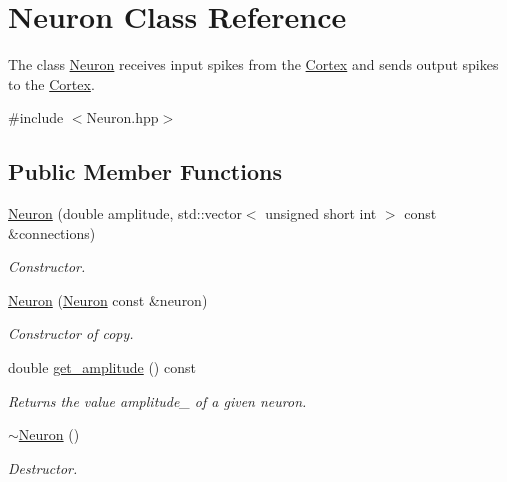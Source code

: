 \hypertarget{class_neuron}{}\section{Neuron Class Reference}
\label{class_neuron}


The class \hyperlink{class_neuron}{Neuron} receives input spikes from the \hyperlink{class_cortex}{Cortex} and sends output spikes to the \hyperlink{class_cortex}{Cortex}.  




{\ttfamily \#include $<$Neuron.\+hpp$>$}

\subsection*{Public Member Functions}
\begin{DoxyCompactItemize}
\item 
\hyperlink{class_neuron_a8e6997ac7838c5e6ff3e961aa9d559b2}{Neuron} (double amplitude, std\+::vector$<$ unsigned short int $>$ const \&connections)
\begin{DoxyCompactList}\small\item\em Constructor. \end{DoxyCompactList}\item 
\hyperlink{class_neuron_a3c1af2530cdcbb2882ff6d86620509b1}{Neuron} (\hyperlink{class_neuron}{Neuron} const \&neuron)
\begin{DoxyCompactList}\small\item\em Constructor of copy. \end{DoxyCompactList}\item 
\hypertarget{class_neuron_aed19168af1c75f178ee5c606bcc8d296}{}\label{class_neuron_aed19168af1c75f178ee5c606bcc8d296} 
double \hyperlink{class_neuron_aed19168af1c75f178ee5c606bcc8d296}{get\+\_\+amplitude} () const
\begin{DoxyCompactList}\small\item\em Returns the value {\itshape amplitude\+\_\+} of a given neuron. \end{DoxyCompactList}\item 
\hypertarget{class_neuron_a94a250ce7e167760e593979b899745b1}{}\label{class_neuron_a94a250ce7e167760e593979b899745b1} 
\hyperlink{class_neuron_a94a250ce7e167760e593979b899745b1}{$\sim$\+Neuron} ()
\begin{DoxyCompactList}\small\item\em Destructor. \end{DoxyCompactList}\item 

\end{DoxyCompactItemize}
